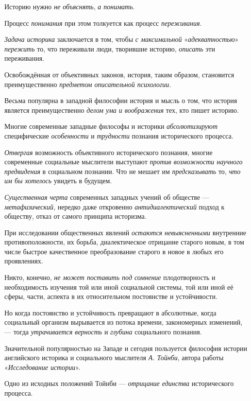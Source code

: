 \documentclass[a4paper,14pt,russian]{extreport}
\begin{document}
Историю нужно \emph{не объяснять}, \emph{а понимать}.

Процесс \emph{понимания} при этом толкуется как процесс \emph{переживания}.

\emph{Задача историка} заключается в том, чтобы \emph{с максимальной} «\emph{адекватностью}» \emph{пережить} то, что переживали люди, творившие историю, \emph{описать} эти переживания.

Освобождённая от объективных законов, история, таким образом, становится преимущественно \emph{предметом описательной психологии}.

Весьма популярна в западной философии история и мысль о том, что история является преимущественно \emph{делом ума и воображения} тех, кто пишет историю.

Многие современные западные философы и историки \emph{абсолютизируют} специфические \emph{особенности} и \emph{трудности} познания исторического процесса.

\emph{Отвергая} возможность объективного исторического познания, многие современные социальные мыслители выступают \emph{против возможности научного предвидения} в социальном познании. Что не мешает им \emph{предсказывать} то, \emph{что им бы хотелось} увидеть в будущем.

\emph{Существенная черта} современных западных учений об обществе --- \emph{метафизический}, нередко даже откровенно \emph{антидиалектический} подход к обществу, отказ от самого принципа историзма.

При исследовании общественных явлений \emph{остаются невыясненными} внутренние противоположности, их борьба, диалектическое отрицание старого новым, в том числе быстрое качественное преобразование старого в новое в любых его проявлениях.

Никто, конечно, \emph{не может поставить под сомнение} плодотворность и необходимость изучения той или иной социальной системы, той или иной её сферы, части, аспекта в их относительном постоянстве и устойчивости.

Но когда постоянство и устойчивость превращают в абсолютные, когда социальный организм вырывается из потока времени, закономерных изменений, --- тогда \emph{утрачивается верность} и \emph{глубина} социального познания.

Значительной популярностью на Западе и сегодня пользуется философия истории английского историка и социального мыслителя \emph{А. Тойнби}, автора работы «\emph{Исследование истории}».

Одно из исходных положений Тойнби --- \emph{отрицание единства} исторического процесса.
\end{document}
